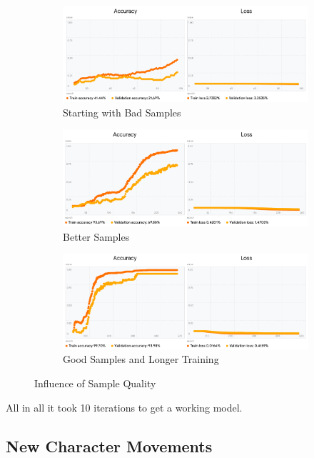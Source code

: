 \documentclass[a4paper,titlepage]{article}
\begin{document}
\begin{figure}[H]
    \begin{subfigure}[b]{\linewidth}
        \includegraphics[width=\linewidth]{train_1.png}
        \caption{Starting with Bad Samples}
    \end{subfigure}
    \begin{subfigure}[b]{\linewidth}
        \includegraphics[width=\linewidth]{train_2.png}
        \caption{Better Samples}
    \end{subfigure}
    \begin{subfigure}[b]{\linewidth}
        \includegraphics[width=\linewidth]{train_3.png}
        \caption{Good Samples and Longer Training}
    \end{subfigure}
    \caption{Influence of Sample Quality}
\end{figure}

All in all it took 10 iterations to get a working model.

\newpage
\subsection{New Character Movements}
\end{document}
